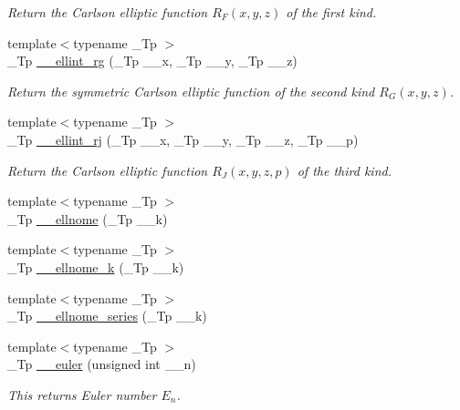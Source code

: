 \begin{DoxyCompactItemize}
\begin{DoxyCompactList}\small\item\em Return the Carlson elliptic function $ R_F(x,y,z) $ of the first kind. \end{DoxyCompactList}\item 
{\footnotesize template$<$typename \+\_\+\+Tp $>$ }\\\+\_\+\+Tp \hyperlink{namespacestd_1_1____detail_aaceff1eb320e0602afee36c60b80f87a}{\+\_\+\+\_\+ellint\+\_\+rg} (\+\_\+\+Tp \+\_\+\+\_\+x, \+\_\+\+Tp \+\_\+\+\_\+y, \+\_\+\+Tp \+\_\+\+\_\+z)
\begin{DoxyCompactList}\small\item\em Return the symmetric Carlson elliptic function of the second kind $ R_G(x,y,z) $. \end{DoxyCompactList}\item 
{\footnotesize template$<$typename \+\_\+\+Tp $>$ }\\\+\_\+\+Tp \hyperlink{namespacestd_1_1____detail_afe05ce66130b5f47389137c3f9aa6949}{\+\_\+\+\_\+ellint\+\_\+rj} (\+\_\+\+Tp \+\_\+\+\_\+x, \+\_\+\+Tp \+\_\+\+\_\+y, \+\_\+\+Tp \+\_\+\+\_\+z, \+\_\+\+Tp \+\_\+\+\_\+p)
\begin{DoxyCompactList}\small\item\em Return the Carlson elliptic function $ R_J(x,y,z,p) $ of the third kind. \end{DoxyCompactList}\item 
{\footnotesize template$<$typename \+\_\+\+Tp $>$ }\\\+\_\+\+Tp \hyperlink{namespacestd_1_1____detail_ac94c9cd28ee7973229e4a63d9b984711}{\+\_\+\+\_\+ellnome} (\+\_\+\+Tp \+\_\+\+\_\+k)
\item 
{\footnotesize template$<$typename \+\_\+\+Tp $>$ }\\\+\_\+\+Tp \hyperlink{namespacestd_1_1____detail_a7631f367a1be34f98cec2021d588457b}{\+\_\+\+\_\+ellnome\+\_\+k} (\+\_\+\+Tp \+\_\+\+\_\+k)
\item 
{\footnotesize template$<$typename \+\_\+\+Tp $>$ }\\\+\_\+\+Tp \hyperlink{namespacestd_1_1____detail_aec07b9131f90495831d349d22768425f}{\+\_\+\+\_\+ellnome\+\_\+series} (\+\_\+\+Tp \+\_\+\+\_\+k)
\item 
{\footnotesize template$<$typename \+\_\+\+Tp $>$ }\\\+\_\+\+Tp \hyperlink{namespacestd_1_1____detail_a38f2ed4541c9876b8549c3917aad3b08}{\+\_\+\+\_\+euler} (unsigned int \+\_\+\+\_\+n)
\begin{DoxyCompactList}\small\item\em This returns Euler number $ E_n $. \end{DoxyCompactList}\item 

\end{DoxyCompactItemize}
